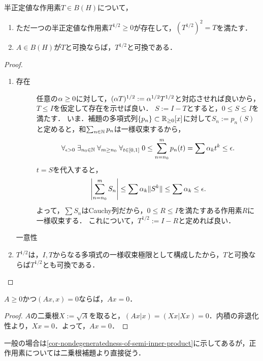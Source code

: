 \documentclass[uplatex,dvipdfmx]{jsreport}
\begin{document}
\begin{proposition}\label{prop-square-root-lemma}
    半正定値な作用素$T\in B(H)$について，
    \begin{enumerate}
        \item ただ一つの半正定値な作用素$T^{1/2}\ge0$が存在して，$(T^{1/2})^2=T$を満たす．
        \item $A\in B(H)$が$T$と可換ならば，$T^{1/2}$と可換である．
    \end{enumerate}
\end{proposition}
\begin{proof}\mbox{}
    \begin{enumerate}
        \item 
        \begin{description}
            \item[存在] 任意の$\alpha\ge 0$に対して，$(\alpha T)^{1/2}:=\alpha^{1/2}T^{1/2}$と対応させれば良いから，$T\le I$を仮定して存在を示せば良い．
            $S:=I-T$とすると，$0\le S\le I$を満たす．
            いま．補題の多項式列$\{p_n\}\subset\mathbb{R}_{\ge 0}[x]$に対して$S_n:=p_n(S)$と定めると，和$\sum_{n\in\mathbb{N}}p_n$は一様収束するから，
            \[\forall_{\epsilon>0}\;\exists_{n_0\in\mathbb{N}}\;\forall_{m\ge n_0}\;\forall_{t\in[0,1]}\;0\le\sum_{n=n_0}^mp_n(t)=\sum\alpha_kt^k\le\epsilon.\]
            $t=S$を代入すると，
            \[\left|\sum^m_{n=n_0}S_n\right|\le\sum\alpha_k\|S^k\|\le\sum\alpha_k\le\epsilon.\]
            よって，$\sum S_n$はCauchy列だから，$0\le R\le I$を満たすある作用素$R$に一様収束する．
            これについて，$T^{1/2}:=I-R$と定めれば良い．
            \item[一意性]
        \end{description}
        \item $T^{1/2}$は，$I,T$からなる多項式の一様収束極限として構成したから，$T$と可換ならば$T^{1/2}$とも可換である．
    \end{enumerate}
\end{proof}

\begin{corollary}
    $A\ge 0$かつ$(Ax,x)=0$ならば，$Ax=0$．
\end{corollary}
\begin{proof}
    $A$の二乗根$X:=\sqrt{A}$を取ると，$(Ax|x)=(Xx|Xx)=0$．内積の非退化性より，$Xx=0$．よって，$Ax=0$．
\end{proof}
\begin{remark}
    一般の場合は\ref{cor-nondegeneratedness-of-semi-inner-product}に示してあるが，正作用素については二乗根補題より直接従う．
\end{remark}
\end{document}
